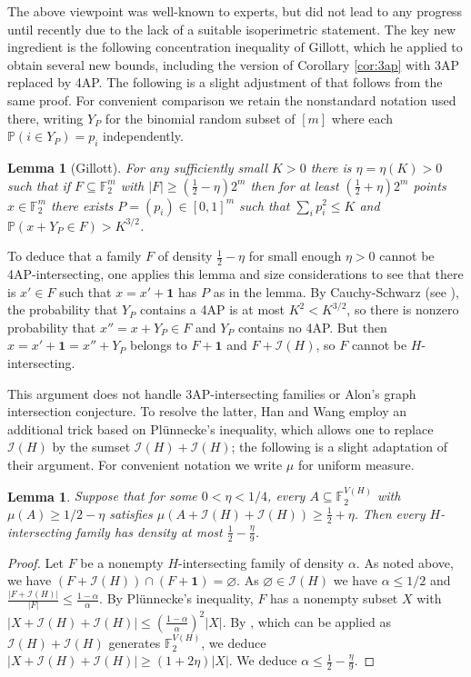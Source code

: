 \documentclass[10pt,a4paper]{amsart}
\newtheorem{lemma}[theorem]{Lemma}
\newcommand{\I}{\mathcal I}
\newcommand{\Prob}{\mathbb P}
\newcommand{\1}{\mathbf 1}
\begin{document}
The above viewpoint was well-known to experts, but did not lead to any progress
until recently due to the lack of a suitable isoperimetric statement. The key new
ingredient is the following concentration inequality of Gillott, which he applied to
obtain several new bounds, including the version of Corollary \ref{cor:3ap}
with 3AP replaced by 4AP. The following is a slight adjustment of
\cite[Theorem~3.1]{Gillott2026} that follows from the same proof.
For convenient comparison we retain the nonstandard notation used there,
writing $Y_P$ for the binomial random subset of $[m]$ where
each $\Prob(i \in Y_P)=p_i$ independently.

\begin{lemma}[Gillott]\label{lem:gillott-param}
For any sufficiently small $K>0$ there is  \(\eta=\eta(K)>0\)
such that if \(F\subseteq\mathbb{F}_2^m\) with $|F| \ge (\tfrac12-\eta)2^m$
then for at least $ (\tfrac12+\eta)2^m$ points  \(x\in\mathbb{F}_2^m\) 
there exists \(P=(p_i)\in[0,1]^m\) such that $\sum_i p_i^2\le K$
and $ \Prob(x+Y_P\in F)>K^{3/2}$.
\end{lemma}

To deduce that a family $F$ of density $\tfrac12-\eta$ for small enough $\eta>0$
cannot be 4AP-intersecting, one applies this lemma and size considerations to see
that there is $x' \in F$ such that $x=x'+\1$ has $P$ as in the lemma.
By Cauchy-Schwarz (see \cite[Theorem~3.3]{Gillott2026}),
the probability that $Y_P$ contains a 4AP is at most $K^2 < K^{3/2}$,
so there is nonzero probability that $x''=x+Y_P \in F$ and $Y_P$ contains no 4AP.
But then $x=x'+\1=x''+Y_P$ belongs to $F+\1$ and $F+\I(H)$, so $F$ cannot be $H$-intersecting.

This argument does not handle 3AP-intersecting families or Alon's graph intersection conjecture.
To resolve the latter, Han and Wang \cite{HanWang2026} employ an additional trick 
based on  Pl\"unnecke's inequality, which allows one to replace $\I(H)$ by the sumset $\I(H)+\I(H)$;
the following is a slight adaptation of their argument. For convenient notation we write $\mu$ for uniform measure.

\begin{lemma}\label{lem:additive-reduction}
Suppose that for some \(0<\eta<1/4\), every
\( A\subseteq\mathbb{F}_2^{V(H)}\) with \( \mu(A)\ge1/2-\eta\) 
satisfies \( \mu( A+\I(H)+\I(H))\ge\frac12+\eta\).
Then every \(H\)-intersecting family has density
at most $\tfrac12-\tfrac{\eta}{9}$.
\end{lemma}

\begin{proof}
Let \(F\) be a nonempty \(H\)-intersecting family of density \(\alpha\). 
As noted above, we have \((F+\I(H))\cap(F+\1)=\varnothing\).
As \(\varnothing\in\I(H)\) we have $\alpha \le 1/2$
and $\frac{|F+\I(H)|}{|F|} \le\frac{1-\alpha}{\alpha}$.
By Pl\"unnecke's inequality, $F$ has a nonempty subset $X$
with \(  |X+\I(H)+\I(H)| \le
  \left(\frac{1-\alpha}{\alpha}\right)^2|X| \).
By \cite[Lemma 2.2]{HanWang2026}, which can be applied
as $\I(H)+\I(H)$ generates $\mathbb{F}_2^{V(H)}$,
we deduce \(|X+\I(H)+\I(H)|\ge(1+2\eta)|X|\).
We deduce $\alpha \le \tfrac12-\tfrac{\eta}{9}$.
\end{proof}
\end{document}
